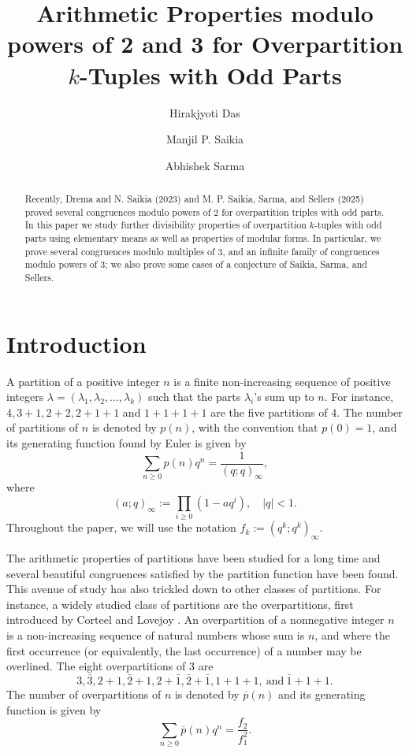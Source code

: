 \documentclass[12pt,reqno]{amsart}
\title[Arithmetic Properties for Overpartition $k$-tuples with Odd Parts]{Arithmetic Properties modulo powers of 2 and 3 for Overpartition $k$-Tuples with Odd Parts}
\author[H. Das]{Hirakjyoti Das}
\author[M. P. Saikia]{Manjil P. Saikia}
\author[A. Sarma]{Abhishek Sarma}
\numberwithin{equation}{section}
\newcommand{\op}{\overline{p}}
\begin{document}
\begin{abstract}
    Recently, Drema and N. Saikia (2023) and M. P. Saikia, Sarma, and Sellers (2025) proved several congruences modulo powers of $2$ for overpartition triples with odd parts. In this paper we study further divisibility properties of overpartition $k$-tuples with odd parts using elementary means as well as properties of modular forms. In particular, we prove several congruences modulo multiples of $3$, and an infinite family of congruences modulo powers of $3$; we also prove some cases of a conjecture of Saikia, Sarma, and Sellers.
\end{abstract}

\maketitle


\section{Introduction}


A partition of a positive integer $n$ is a finite non-increasing sequence of positive integers $\lambda=(\lambda_1, \lambda_2, \ldots, \lambda_k)$ such that the parts $\lambda_i$'s sum up to $n$. For instance, $4,3+1,2+2,2+1+1$ and $1+1+1+1$ are the five partitions of $4$. The number of partitions of $n$ is denoted by $p(n)$, with the convention that $p(0)=1$, and its generating function found by Euler is given by
\[
\sum_{n\geq 0}p(n)q^n=\frac{1}{(q;q)_\infty},
\]
where
\[
(a;q)_\infty:=\prod_{i\geq 0}(1-aq^i), \quad |q|<1.
\] Throughout the paper, we will use the notation $f_{k} := (q^k;q^k)_{\infty}$.

The arithmetic properties of partitions have been studied for a long time and several beautiful congruences satisfied by the partition function have been found. This avenue of study has also trickled down to other classes of partitions. For instance, a widely studied class of partitions are the overpartitions, first introduced by Corteel and Lovejoy \cite{CorteelLovejoy}. An overpartition of a nonnegative integer $n$ is a non-increasing sequence of natural numbers whose sum is $n$, and where the first occurrence (or equivalently, the last occurrence) of a number may be overlined. The eight overpartitions of 3 are
\[3,\bar{3},2+1,\bar{2}+1,2+\bar{1},\bar{2}+\bar{1},1+1+1,~\text{and}~\bar{1}+1+1.\]The number of overpartitions of $n$ is denoted by $\op(n)$ and its generating function is given by
\[
\sum_{n\geq 0}\op(n)q^n=\frac{f_{2}}{f_{1}^2}.
\]
\end{document}
